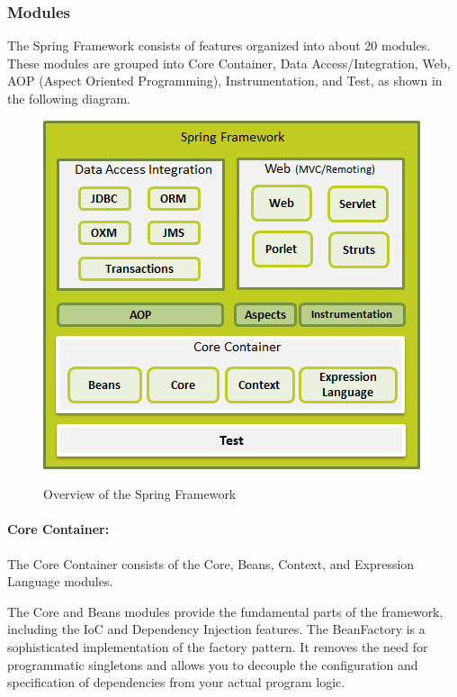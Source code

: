 \subsubsection{Modules}
The Spring Framework consists of features organized into about 20 modules. These modules are
grouped into Core Container, Data Access/Integration, Web, AOP (Aspect Oriented Programming),
Instrumentation, and Test, as shown in the following diagram.


\begin{figure}[htb]
  \centering
  \includegraphics[scale=0.6]{spring_architecture.png}\\
  \caption{Overview of the Spring Framework}
  \label{fig:spring_arch}
\end{figure}



\paragraph{Core Container:}

The Core Container consists of the Core, Beans, Context, and Expression Language modules.

The Core and Beans modules provide the fundamental parts of the framework, including the IoC and
Dependency Injection features. The BeanFactory is a sophisticated implementation of the factory
pattern. It removes the need for programmatic singletons and allows you to decouple the configuration
and specification of dependencies from your actual program logic.

